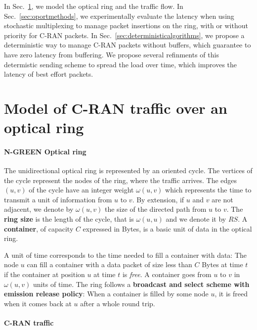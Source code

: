 \documentclass[]{llncs}
\begin{document}
In Sec.~\ref{sec:model}, we model the optical ring and the traffic flow. In Sec.~\ref{sec:oportmethods}, we experimentally evaluate the latency when using stochastic multiplexing to manage packet insertions on the ring, with or without priority for C-RAN packets. In Sec.~\ref{sec:deterministicalgorithms}, we propose a deterministic way to manage C-RAN packets without buffers, which guarantee to have zero latency from buffering. We propose several refinments of this determistic sending scheme to spread the load over time, which improves the latency of best effort packets.

\section{Model of C-RAN traffic over an optical ring}
\label{sec:model}
    
  \paragraph{N-GREEN Optical ring}
   
  The unidirectional optical ring is represented by an oriented cycle. The vertices of the cycle represent the nodes of the ring, where the traffic arrives. The edges $(u,v)$ of the cycle have an integer weight $\omega(u,v)$ which represents the time to transmit a unit of information from $u$ to $v$. By extension, if $u$ and $v$ are not adjacent, we denote by $\omega(u,v)$ the size of the directed path from $u$ to $v$.  The \textbf{ring size} is the length of the cycle, that is $\omega(u,u)$ and we denote it by $RS$. A {\bf container}, of capacity $C$  expressed in Bytes, is a basic unit of data in the optical ring. 
  
  A unit of time corresponds to the time needed to fill a container with data:
  The node $u$ can fill a container with a data packet of size less than $C$ Bytes at time $t$ if the container 
  at position $u$ at time $t$ is \emph{free}. A container goes from $u$ to $v$ in $\omega(u,v)$ units of time. The ring follows a {\bf broadcast and select scheme with emission release policy}: When a container is filled by some node $u$, it is freed when it comes back at $u$ after a whole round trip.
  
     \paragraph{C-RAN traffic}
   
\end{document}
